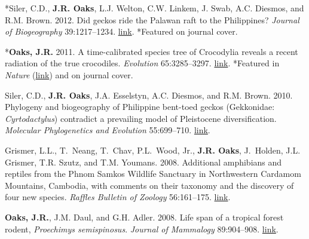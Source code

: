 \documentclass[10pt]{article}
\begin{document}
\begin{thebibliography}{8}
*Siler, C.D., {\bf J.R. Oaks}, L.J. Welton, C.W. Linkem, J. Swab, A.C. Diesmos,
  and R.M. Brown. 2012.
\newblock Did geckos ride the {P}alawan raft to the {P}hilippines?
\newblock \emph{Journal of Biogeography} 39:1217--1234.
\newblock
  \href{http://onlinelibrary.wiley.com/doi/10.1111/j.1365-2699.2011.02680.x/abstract}{link}.
  *Featured on journal cover.

*{\bf Oaks, J.R.} 2011.
\newblock A time-calibrated species tree of {C}rocodylia reveals a recent
  radiation of the true crocodiles.
\newblock \emph{Evolution} 65:3285--3297.
\newblock
  \href{http://onlinelibrary.wiley.com/doi/10.1111/j.1558-5646.2011.01373.x/abstract}{link}.
  *Featured in \emph{Nature}
  (\href{http://www.nature.com/nature/journal/v474/n7353/full/474545a.html}{link})
  and on journal cover.

Siler, C.D., {\bf J.R. Oaks}, J.A. Esselstyn, A.C. Diesmos, and R.M. Brown.
  2010.
\newblock Phylogeny and biogeography of {P}hilippine bent-toed geckos
  ({G}ekkonidae: \emph{{C}yrtodactylus}) contradict a prevailing model of
  {P}leistocene diversification.
\newblock \emph{Molecular Phylogenetics and Evolution} 55:699--710.
\newblock
  \href{http://www.sciencedirect.com/science/article/pii/S1055790310000382}{link}.

Grismer, L.L., T.~Neang, T.~Chav, P.L.~Wood, Jr., {\bf J.R. Oaks}, J.~Holden,
  J.L. Grismer, T.R. Szutz, and T.M. Youmans. 2008.
\newblock Additional amphibians and reptiles from the {P}hnom {S}amkos
  {W}ildlife {S}anctuary in {N}orthwestern {C}ardamom {M}ountains, {C}ambodia,
  with comments on their taxonomy and the discovery of four new species.
\newblock \emph{Raffles Bulletin of Zoology} 56:161--175.
\newblock
  \href{http://rmbr.nus.edu.sg/rbz/biblio/56/56rbz161-175.pdf}{link}.

{\bf Oaks, J.R.}, J.M. Daul, and G.H. Adler. 2008.
\newblock Life span of a tropical forest rodent, \emph{{P}roechimys
  semispinosus}.
\newblock \emph{Journal of Mammalogy} 89:904--908.
\newblock \href{http://dx.doi.org/10.1644/07-MAMM-A-045.1}{link}.

\end{thebibliography}
\end{document}
